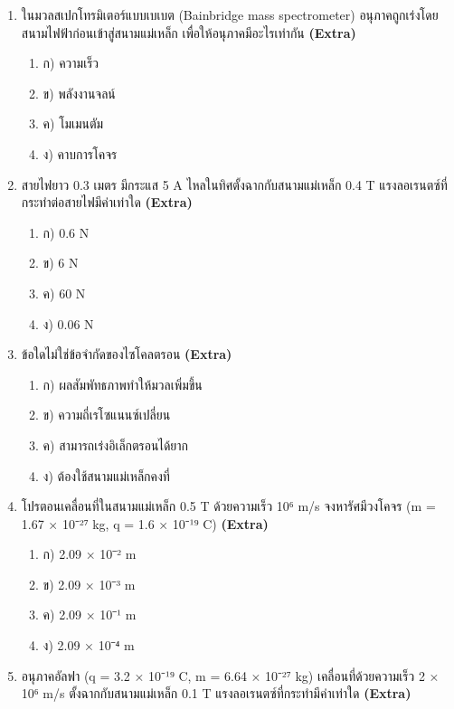 \documentclass[12pt]{article}
\begin{document}
\begin{enumerate}[label=\arabic*.]
\begin{enumerate}[label=)]
\item ค) รัศมีเท่ากัน
\item ง) ขึ้นกับทิศทางการเคลื่อนที่
\end{enumerate}
\item ในมวลสเปกโทรมิเตอร์แบบเบเบต (Bainbridge mass spectrometer) อนุภาคถูกเร่งโดยสนามไฟฟ้าก่อนเข้าสู่สนามแม่เหล็ก เพื่อให้อนุภาคมีอะไรเท่ากัน \hfill \textbf{\small (Extra)}
\begin{enumerate}[label=)]
\item ก) ความเร็ว
\item ข) พลังงานจลน์
\item ค) โมเมนตัม
\item ง) คาบการโคจร
\end{enumerate}
\item สายไฟยาว 0.3 เมตร มีกระแส 5 A ไหลในทิศตั้งฉากกับสนามแม่เหล็ก 0.4 T แรงลอเรนตซ์ที่กระทำต่อสายไฟมีค่าเท่าใด \hfill \textbf{\small (Extra)}
\begin{enumerate}[label=)]
\item ก) 0.6 N
\item ข) 6 N
\item ค) 60 N
\item ง) 0.06 N
\end{enumerate}
\item ข้อใดไม่ใช่ข้อจำกัดของไซโคลตรอน \hfill \textbf{\small (Extra)}
\begin{enumerate}[label=)]
\item ก) ผลสัมพัทธภาพทำให้มวลเพิ่มขึ้น
\item ข) ความถี่เรโซแนนซ์เปลี่ยน
\item ค) สามารถเร่งอิเล็กตรอนได้ยาก
\item ง) ต้องใช้สนามแม่เหล็กคงที่
\end{enumerate}
\item โปรตอนเคลื่อนที่ในสนามแม่เหล็ก 0.5 T ด้วยความเร็ว 10⁶ m/s จงหารัศมีวงโคจร (m = 1.67 × 10⁻²⁷ kg, q = 1.6 × 10⁻¹⁹ C) \hfill \textbf{\small (Extra)}
\begin{enumerate}[label=)]
\item ก) 2.09 × 10⁻² m
\item ข) 2.09 × 10⁻³ m
\item ค) 2.09 × 10⁻¹ m
\item ง) 2.09 × 10⁻⁴ m
\end{enumerate}
\item อนุภาคอัลฟา (q = 3.2 × 10⁻¹⁹ C, m = 6.64 × 10⁻²⁷ kg) เคลื่อนที่ด้วยความเร็ว 2 × 10⁶ m/s ตั้งฉากกับสนามแม่เหล็ก 0.1 T แรงลอเรนตซ์ที่กระทำมีค่าเท่าใด \hfill \textbf{\small (Extra)}

\end{enumerate}
\end{document}
